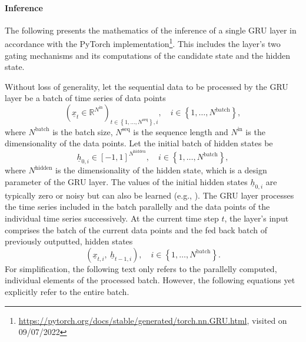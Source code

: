 \paragraph*{Inference}$\ $\\
The following presents the mathematics 
of the inference
of a single GRU layer
in accordance with the PyTorch implementation\footnote{
    \url{https://pytorch.org/docs/stable/generated/torch.nn.GRU.html}, visited on 09/07/2022
}.
This includes the layer's two gating mechanisms
and its computations of the candidate state and the hidden state.






Without loss of generality,
let the sequential data to be processed by the GRU layer
be a batch of time series of data points
\begin{equation}
    \left(
        \underline x_t
        \in \mathbb{R}^{N^\text{in}}
    \right)_{
        t \in \left\{
            1, \dots, N^\text{seq}
        \right\}
        ,
        i
    }
    ,\quad
    i \in \left\{
        1, \dots, N^\text{batch}
    \right\},
\end{equation}
where $N^\text{batch}$ is the batch size, 
$N^\text{seq}$ is the sequence length 
and $N^\text{in}$ is the dimensionality of the data points.
Let the initial batch of hidden states be
\begin{equation} \label{eq:gru_init_hidden_state}
    \underline h_{0,i}
    \in \left[-1, 1\right]^{N^\text{hidden}}
    ,\quad
    i \in \left\{
        1, \dots, N^\text{batch}
    \right\},
\end{equation}
where $N^\text{hidden}$ is the dimensionality
of the hidden state, which is a design parameter of the GRU layer.
The values of the initial hidden states $\underline h_{0,i}$
are typically zero or noisy \cite{Zimmermann2012}
but can also be learned (e.g., \cite{Forcada1995}).
The GRU layer processes the time series included in the batch parallelly 
and the data points of the individual time series successively.
At the current time step $t$,
the layer's input comprises 
the batch of the current data points
and the fed back batch of previously outputted, hidden states
\begin{equation}
    \left(
    \underline x_{t,i}
    ,\ 
    \underline h_{t-1,i}
    \right)
    ,\quad
    i \in \left\{
        1, \dots, N^\text{batch}
    \right\}.
\end{equation}
For simplification, the following text only refers 
to the parallelly computed, individual elements of the processed batch. 
However, the following equations yet explicitly refer to the entire batch.


